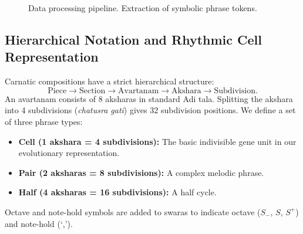 \documentclass[conference,letterpaper]{IEEEtran}
\begin{document}
\begin{figure}[t]
\centering
{}
\caption{Data processing pipeline. Extraction of symbolic phrase tokens.}
\label{fig:data}
\end{figure}

\subsection{Hierarchical Notation and Rhythmic Cell Representation}
Carnatic compositions have a strict hierarchical structure:
\begin{equation}
 \text{Piece} \rightarrow \text{Section} \rightarrow \text{Avartanam} \rightarrow \text{Akshara} \rightarrow \text{Subdivision}.
\end{equation}
An avartanam consists of 8 aksharas in standard Adi tala. Splitting the akshara into 4 subdivisions (\textit{chatusra gati}) gives 32 subdivision positions. We define a set of three phrase types:
\begin{itemize}
    \item \textbf{Cell (1 akshara = 4 subdivisions):} The basic indivisible gene unit in our evolutionary representation.
    \item \textbf{Pair (2 aksharas = 8 subdivisions):} A complex melodic phrase.
    \item \textbf{Half (4 aksharas = 16 subdivisions):} A half cycle.
\end{itemize}
Octave and note-hold symbols are added to swaras to indicate octave ($S_-$, $S$, $S^+$) and note-hold (`,').
\end{document}
